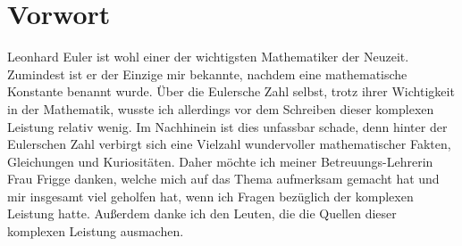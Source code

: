 \section{Vorwort}
Leonhard Euler ist wohl einer der wichtigsten Mathematiker der Neuzeit. Zumindest ist er der Einzige mir bekannte, nachdem eine mathematische Konstante benannt wurde. Über die Eulersche Zahl selbst, trotz ihrer Wichtigkeit in der Mathematik, wusste ich allerdings vor dem Schreiben dieser komplexen Leistung relativ wenig. Im Nachhinein ist dies unfassbar schade, denn hinter der Eulerschen Zahl verbirgt sich eine Vielzahl wundervoller mathematischer Fakten, Gleichungen und Kuriositäten. Daher möchte ich meiner Betreuungs-Lehrerin Frau Frigge danken, welche mich auf das Thema aufmerksam gemacht hat und mir insgesamt viel geholfen hat, wenn ich Fragen bezüglich der komplexen Leistung hatte. Außerdem danke ich den Leuten, die die Quellen dieser komplexen Leistung ausmachen.
